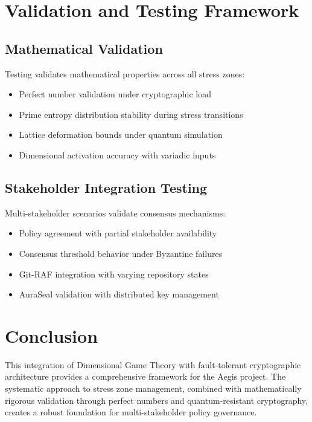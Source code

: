\documentclass[a4paper,12pt]{article}
\begin{document}
\section{Validation and Testing Framework}

\subsection{Mathematical Validation}

Testing validates mathematical properties across all stress zones:

\begin{itemize}
\item Perfect number validation under cryptographic load
\item Prime entropy distribution stability during stress transitions
\item Lattice deformation bounds under quantum simulation
\item Dimensional activation accuracy with variadic inputs
\end{itemize}

\subsection{Stakeholder Integration Testing}

Multi-stakeholder scenarios validate consensus mechanisms:

\begin{itemize}
\item Policy agreement with partial stakeholder availability
\item Consensus threshold behavior under Byzantine failures
\item Git-RAF integration with varying repository states
\item AuraSeal validation with distributed key management
\end{itemize}

\section{Conclusion}

This integration of Dimensional Game Theory with fault-tolerant cryptographic architecture provides a comprehensive framework for the Aegis project. The systematic approach to stress zone management, combined with mathematically rigorous validation through perfect numbers and quantum-resistant cryptography, creates a robust foundation for multi-stakeholder policy governance.
\end{document}
